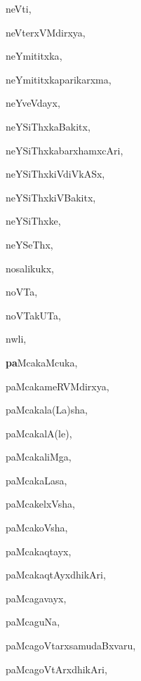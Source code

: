 \begin{multicols}{3}
{\noindent
{neVti}, \pageref{neVti}

\noindent
{neVterxVMdirxya}, \pageref{neVterxVMdirxya}

\noindent
{neYmititxka}, \pageref{neYmititxka}

\noindent
{neYmititxkaparikarxma}, \pageref{neYmititxkaparikarxma}

\noindent
{neYveVdayx}, \pageref{neYveVdayx}

\noindent
{neYSiThxkaBakitx}, \pageref{neYSiThxkaBakitx}

\noindent
{neYSiThxkabarxhamxcAri}, \pageref{neYSiThxkabarxhamxcAri}

\noindent
{neYSiThxkiVdiVkASx}, \pageref{neYSiThxkiVdiVkASx}

\noindent
{neYSiThxkiVBakitx}, \pageref{neYSiThxkiVBakitx}

\noindent
{neYSiThxke}, \pageref{neYSiThxke}

\noindent
{neYSeThx}, \pageref{neYSeThx}

\noindent
{nosalikukx}, \pageref{nosalikukx}

\noindent
{noVTa}, \pageref{noVTa}

\noindent
{noVTakUTa}, \pageref{noVTakUTa}

\noindent
{nwli}, \pageref{nwli}

\noindent
{{\large\textbf{pa}}McakaMcuka}, \pageref{paMcakaMcuka}

\noindent
{paMcakameRVMdirxya}, \pageref{paMcakameRVMdirxya}

\noindent
{paMcakala(La)sha}, \pageref{paMcakalaLasha}

\noindent
{paMcakalA(le)}, \pageref{paMcakalAle}

\noindent
{paMcakaliMga}, \pageref{paMcakaliMga}

\noindent
{paMcakaLasa}, \pageref{paMcakaLasa}

\noindent
{paMcakelxVsha}, \pageref{paMcakelxVsha}

\noindent
{paMcakoVsha}, \pageref{paMcakoVsha}

\noindent
{paMcakaqtayx}, \pageref{paMcakaqtayx}

\noindent
{paMcakaqtAyxdhikAri}, \pageref{paMcakaqtAyxdhikAri}

\noindent
{paMcagavayx}, \pageref{paMcagavayx}

\noindent
{paMcaguNa}, \pageref{paMcaguNa}

\noindent
{paMcagoVtarxsamudaBxvaru}, \pageref{paMcagoVtarxsamudaBxvaru}

\noindent
{paMcagoVtArxdhikAri}, \pageref{paMcagoVtArxdhikAri}

}
\end{multicols}

